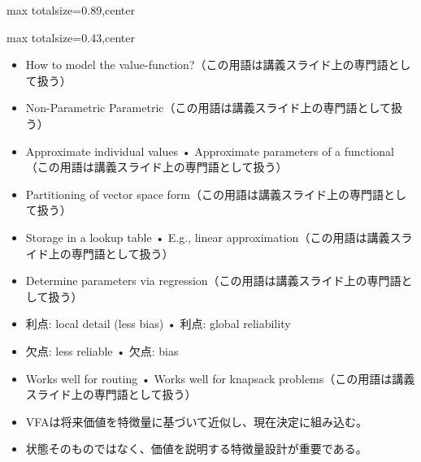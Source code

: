 \begin{minipage}[t]{0.58\textwidth}
\begin{adjustbox}{max totalsize={\textwidth}{0.89\textheight},center}
\begin{minipage}{\textwidth}
\end{minipage}
\end{adjustbox}
\end{minipage}


\clearpage
{}
\begin{minipage}[t]{0.405\textwidth}
\begin{adjustbox}{max totalsize={\textwidth}{0.43\textheight},center}
\begin{minipage}{\textwidth}\scriptsize
{}\begin{itemize}
\item How to model the value-function?（この用語は講義スライド上の専門語として扱う）
\item Non-Parametric Parametric（この用語は講義スライド上の専門語として扱う）
\item Approximate individual values • Approximate parameters of a functional（この用語は講義スライド上の専門語として扱う）
\item Partitioning of vector space form（この用語は講義スライド上の専門語として扱う）
\item Storage in a lookup table • E.g., linear approximation（この用語は講義スライド上の専門語として扱う）
\item Determine parameters via regression（この用語は講義スライド上の専門語として扱う）
\item 利点: local detail (less bias) • 利点: global reliability
\item 欠点: less reliable • 欠点: bias
\item Works well for routing • Works well for knapsack problems（この用語は講義スライド上の専門語として扱う）
\end{itemize}\begin{itemize}
\item VFAは将来価値を特徴量に基づいて近似し、現在決定に組み込む。
\item 状態そのものではなく、価値を説明する特徴量設計が重要である。
\end{itemize}
\end{minipage}
\end{adjustbox}
\end{minipage}\hfill
